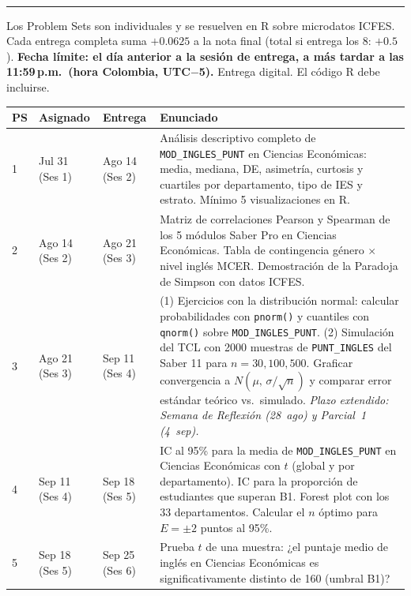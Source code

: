 \documentclass[11pt, a4paper]{article}
\newcommand{\sechead}[1]{%
  \vspace{10pt}%
  \noindent{\large\bfseries #1}\\[-6pt]%
  \rule{\linewidth}{0.5pt}%
  \vspace{2pt}%
}
\begin{document}
\newpage

\sechead{Problem Sets --- Trabajo Aut\'onomo}

Los Problem Sets son individuales y se resuelven en R sobre microdatos ICFES. Cada
entrega completa suma $\mathbf{+0.0625}$ a la nota final (total si entrega los 8: $\mathbf{+0.5}$).
\textbf{Fecha l\'imite: el d\'ia anterior a la sesi\'on de entrega, a m\'as tardar a las 11:59\,p.m.\ (hora Colombia, UTC$-$5).} Entrega digital. El c\'odigo R debe incluirse.

\vspace{6pt}
{\small
\begin{tabularx}{\linewidth}{C{0.8cm} L{1.8cm} L{1.8cm} X}
\toprule
\textbf{PS} & \textbf{Asignado} & \textbf{Entrega} & \textbf{Enunciado} \\
 & Jul 31 (Ses 1) & Ago 14 (Ses 2) &
  An\'alisis descriptivo completo de \texttt{MOD\_INGLES\_PUNT} en Ciencias Econ\'omicas: media, mediana, DE,
  asimetr\'ia, curtosis y cuartiles por departamento, tipo de IES y estrato. M\'inimo 5
  visualizaciones en R. \\[4pt]
2 & Ago 14 (Ses 2) & Ago 21 (Ses 3) &
  Matriz de correlaciones Pearson y Spearman de los 5 m\'odulos Saber Pro en Ciencias Econ\'omicas.
  Tabla de contingencia g\'enero $\times$ nivel ingl\'es MCER.
  Demostraci\'on de la Paradoja de Simpson con datos ICFES. \\[4pt]
3 & Ago 21 (Ses 3) & Sep 11 (Ses 4) &
  (1) Ejercicios con la distribuci\'on normal: calcular probabilidades con
  \texttt{pnorm()} y cuantiles con \texttt{qnorm()} sobre \texttt{MOD\_INGLES\_PUNT}.
  (2) Simulaci\'on del TCL con 2000 muestras de \texttt{PUNT\_INGLES} del Saber 11 para
  $n = 30, 100, 500$. Graficar convergencia a $N(\mu,\,\sigma/\sqrt{n})$
  y comparar error est\'andar te\'orico vs.\ simulado.
  \textit{Plazo extendido: Semana de Reflexi\'on (28~ago) y Parcial~1 (4~sep).} \\[4pt]
4 & Sep 11 (Ses 4) & Sep 18 (Ses 5) &
  IC al 95\% para la media de \texttt{MOD\_INGLES\_PUNT} en Ciencias Econ\'omicas con $t$ (global y por
  departamento). IC para la proporci\'on de estudiantes que superan B1.
  Forest plot con los 33 departamentos. Calcular el $n$ \'optimo para
  $E = \pm 2$ puntos al 95\%. \\[4pt]
5 & Sep 18 (Ses 5) & Sep 25 (Ses 6) &
  Prueba $t$ de una muestra: ¿el puntaje medio de ingl\'es en Ciencias Econ\'omicas es
  significativamente distinto de 160 (umbral B1)?

\end{tabularx}}
\end{document}
